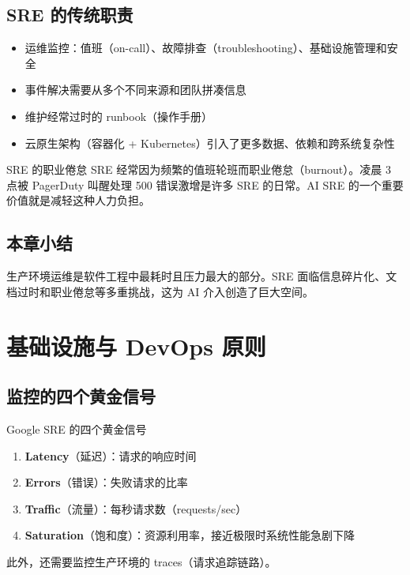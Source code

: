 \documentclass[a4paper]{article}
\begin{document}
\subsection{SRE 的传统职责}

\begin{itemize}
    \item 运维监控：值班（on-call）、故障排查（troubleshooting）、基础设施管理和安全
    \item 事件解决需要从多个不同来源和团队拼凑信息
    \item 维护经常过时的 runbook（操作手册）
    \item 云原生架构（容器化 + Kubernetes）引入了更多数据、依赖和跨系统复杂性
\end{itemize}

\begin{warningbox}{SRE 的职业倦怠}
SRE 经常因为频繁的值班轮班而职业倦怠（burnout）。凌晨 3 点被 PagerDuty 叫醒处理 500 错误激增是许多 SRE 的日常。AI SRE 的一个重要价值就是减轻这种人力负担。
\end{warningbox}

\subsection{本章小结}

生产环境运维是软件工程中最耗时且压力最大的部分。SRE 面临信息碎片化、文档过时和职业倦怠等多重挑战，这为 AI 介入创造了巨大空间。

\section{基础设施与 DevOps 原则}

\subsection{监控的四个黄金信号}

\begin{importantbox}{Google SRE 的四个黄金信号}
\begin{enumerate}
    \item \textbf{Latency}（延迟）：请求的响应时间
    \item \textbf{Errors}（错误）：失败请求的比率
    \item \textbf{Traffic}（流量）：每秒请求数（requests/sec）
    \item \textbf{Saturation}（饱和度）：资源利用率，接近极限时系统性能急剧下降
\end{enumerate}
此外，还需要监控生产环境的 traces（请求追踪链路）。
\end{importantbox}
\end{document}
